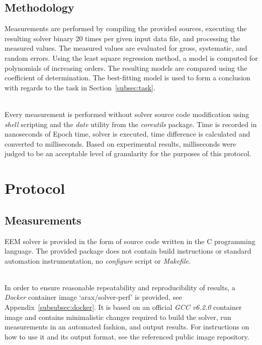 \documentclass[a4paper,12pt]{article}
\begin{document}
\subsection{Methodology}
Measurements are performed by compiling the provided sources, executing the resulting
solver binary 20 times per given input data file, and processing
the measured values. The measured values are evaluated for gross, systematic, and random
errors. Using the least square regression method, a model is computed for polynomials of
increasing orders. The resulting models are compared using the coefficient of determination.
The best-fitting model is used to form a conclusion with regards to the task in
Section~\ref{subsec:task}.

\hfill \\
Every measurement is performed without solver source code modification using \textit{shell}
scripting and the \textit{date} utility from the \textit{coreutils} package. Time is recorded
in nanoseconds of Epoch time, solver is executed, time difference is calculated and converted
to milliseconds. Based on experimental results, milliseconds were judged to be an acceptable
level of granularity for the purposes of this protocol.

\pagebreak

\section{Protocol}

\subsection{Measurements}

EEM solver is provided in the form of source code written in the C programming language.
The provided package does not contain build instructions or standard automation instrumentation,
no \textit{configure} script or \textit{Makefile}.

\hfill \\
In order to ensure reasonable repeatability and reproducibility of
results, a \textit{Docker} container image `arax/solver-perf' is provided, see Appendix~\ref{subsubsec:docker}.
It is based on an official \textit{GCC v6.2.0} container image and contains minimalistic
changes required to build the solver, run measurements in an automated fashion, and
output results. For instructions on how to use it and its output format, see the referenced
public image repository.
\end{document}
